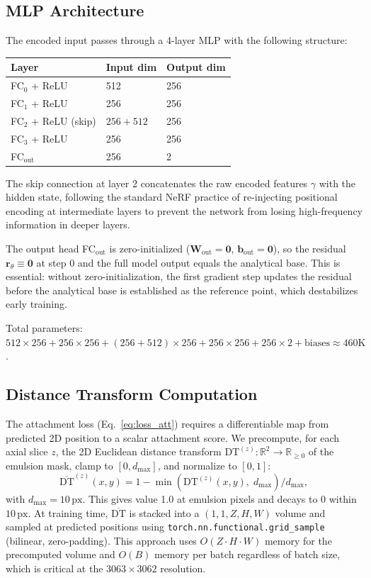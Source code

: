 \documentclass[11pt,a4paper]{article}
\newcommand{\R}{\mathbb{R}}
\begin{document}
\subsection{MLP Architecture}

The encoded input passes through a 4-layer MLP with the following structure:

\begin{center}
\begin{tabular}{lll}
\toprule
Layer & Input dim & Output dim \\
\midrule
FC$_0$ + ReLU & 512 & 256 \\
FC$_1$ + ReLU & 256 & 256 \\
FC$_2$ + ReLU (skip) & $256 + 512$ & 256 \\
FC$_3$ + ReLU & 256 & 256 \\
FC$_{\text{out}}$ & 256 & 2 \\
\bottomrule
\end{tabular}
\end{center}

The skip connection at layer 2 concatenates the raw encoded features $\gamma$ with the hidden state, following the standard NeRF practice of re-injecting positional encoding at intermediate layers to prevent the network from losing high-frequency information in deeper layers.

The output head FC$_{\text{out}}$ is zero-initialized ($\bm{W}_{\text{out}} = \bm{0}$, $\bm{b}_{\text{out}} = \bm{0}$), so the residual $\bm{r}_\theta \equiv \bm{0}$ at step 0 and the full model output equals the analytical base. This is essential: without zero-initialization, the first gradient step updates the residual before the analytical base is established as the reference point, which destabilizes early training.

Total parameters: $512 \times 256 + 256 \times 256 + (256 + 512) \times 256 + 256 \times 256 + 256 \times 2 + \text{biases} \approx 460\text{K}$.

\subsection{Distance Transform Computation}

The attachment loss (Eq.~\ref{eq:loss_att}) requires a differentiable map from predicted 2D position to a scalar attachment score. We precompute, for each axial slice $z$, the 2D Euclidean distance transform $\mathrm{DT}^{(z)} : \R^2 \to \R_{\geq 0}$ of the emulsion mask, clamp to $[0, d_{\max}]$, and normalize to $[0, 1]$:
\begin{equation}
    \overline{\mathrm{DT}}^{(z)}(x, y) = 1 - \min\!\left(\mathrm{DT}^{(z)}(x,y),\; d_{\max}\right) / d_{\max},
\end{equation}
with $d_{\max} = 10\,\text{px}$. This gives value 1.0 at emulsion pixels and decays to 0 within $10\,\text{px}$. At training time, $\overline{\mathrm{DT}}$ is stacked into a $(1, 1, Z, H, W)$ volume and sampled at predicted positions using \texttt{torch.nn.functional.grid\_sample} (bilinear, zero-padding). This approach uses $O(Z \cdot H \cdot W)$ memory for the precomputed volume and $O(B)$ memory per batch regardless of batch size, which is critical at the $3063 \times 3062$ resolution.
\end{document}
